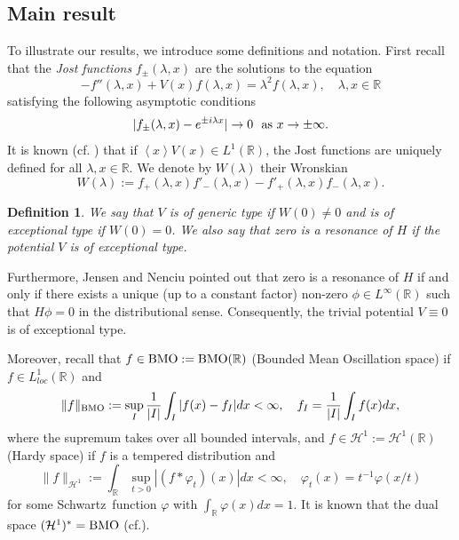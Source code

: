 \documentclass[reqno]{amsart}
\newtheorem{definition}{Definition}[section]
\newcommand\R{\mathbb{R}}
\newcommand\HH{\mathcal{H}}
\numberwithin{equation}{section}
\begin{document}
\subsection{Main result}\label{sec: main result}
To illustrate our results, we introduce some definitions and notation. First recall that the {\it Jost functions} $f_{\pm}(\lambda,x)$ are the solutions to the equation 
 \begin{equation*}
     -f''(\lambda,x)+V(x)f(\lambda,x)=\lambda^2f(\lambda,x),\quad \lambda, x\in\R
 \end{equation*}
 satisfying the following asymptotic conditions
 \begin{equation*}
     |f_{\pm}(\lambda,x)-e^{\pm i\lambda x}|\rightarrow0\ \ {\rm as}\ x\rightarrow\pm \infty.
 \end{equation*}
 It is known (cf. \cite{DT79}) that if $\left<x\right>V(x)\in L^1(\R)$, the Jost functions are uniquely defined for all $\lambda, x\in\R$. We denote by $W(\lambda)$ their Wronskian
 \begin{equation*}
     W(\lambda):=f_+(\lambda,x)f'_-(\lambda,x)-f'_+(\lambda,x)f_-(\lambda,x).
 \end{equation*}
\begin{definition}\label{defin of generic and excep}
We say that $V$ is of generic type if $W(0)\neq0$ and is of exceptional type if $W(0)=0$. We also say that zero is a resonance of $H$ if the potential $V$ is of exceptional type. 
\end{definition}
 Furthermore, Jensen and Nenciu \cite{JN01} pointed out that zero is a resonance of $H$ if and only if there exists a unique (up to a constant factor) non-zero $\phi\in L^{\infty}(\R)$ such that $H\phi=0$ in the distributional sense. Consequently, the trivial potential $V\equiv0$ is of exceptional type.

Moreover, recall that $f\in{\rm BMO}:={\rm BMO}(\R)$ (Bounded Mean Oscillation space) if $f\in L^1_{loc}(\R)$ and $$\|f\|_{{\rm BMO}}:=\sup_{I}\frac{1}{|I|}\int_{I}{}|f(x)-f_{I}|dx<\infty,\quad f_{I}=\frac{1}{|I|}\int_{I}{}f(x)dx,$$
where the supremum takes over all bounded intervals, and $f\in\HH^1:=\HH^1(\R)$ (Hardy space) if $f$ is a tempered distribution and $$\|f\|_{\HH^1}:=\int_{\R}{}\sup_{t>0}|(f*\varphi_{t})(x)|dx<\infty,\quad \varphi_{t}(x)=t^{-1}\varphi(x/t)$$
for some Schwartz\  function $\varphi$ with $\int_{\R}\varphi(x)dx=1$. It is known that the dual space $(\HH^1)^*={\rm BMO}$ (cf.\cite{Fef71}).
    
\end{document}
